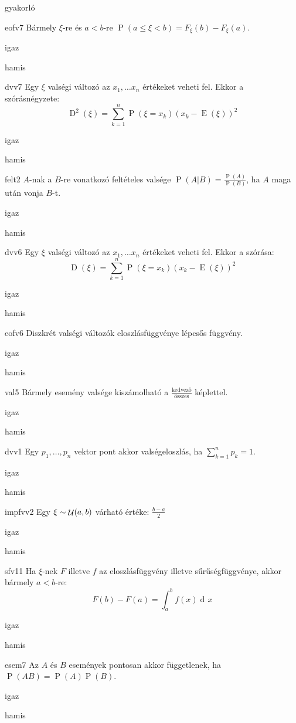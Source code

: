 \documentclass[12pt]{article}
\DeclareMathOperator{\E}{E}
\DeclareMathOperator{\D}{D}
\renewcommand{\P}{\operatorname{P}}
\renewcommand{\d}{\operatorname{d\! }} %
\DeclareMathOperator{\Unif}{{\cal U}}
\begin{document}
\begin{quiz}{gyakorló}
\begin{multi}{eofv7}
Bármely $\xi$-re és $a<b$-re $\P(a\le \xi <b)=F_{\xi}(b)-F_{\xi}(a)$.
\item* igaz
\item hamis
\end{multi}
\begin{multi}{dvv7}
Egy $\xi$ valségi változó az $x_1,\ldots x_n$ értékeket veheti fel. Ekkor a szórásnégyzete:
$$
\D^2(\xi)=\sum_{k=1}^n \P(\xi=x_k)(x_k-\E(\xi))^2
$$
\item* igaz
\item hamis
\end{multi}
\begin{multi}{felt2}
$A$-nak a $B$-re vonatkozó feltételes valsége $\P(A|B)=\frac{\P(A)}{\P(B)}$, ha $A$ maga után vonja $B$-t.
\item* igaz
\item hamis
\end{multi}
\begin{multi}{dvv6}
Egy $\xi$ valségi változó az $x_1,\ldots x_n$ értékeket veheti fel. Ekkor a szórása:
$$
\D(\xi)=\sum_{k=1}^n \P(\xi=x_k)(x_k-\E(\xi))^2
$$
\item igaz
\item* hamis
\end{multi}
\begin{multi}{eofv6}
Diszkrét valségi változók eloszlásfüggvénye lépcsős függvény.
\item* igaz
\item hamis
\end{multi}
\begin{multi}{val5}
Bármely esemény valsége kiszámolható a $\frac{\text{kedvező}}{\text{összes}}$ képlettel.
\item igaz
\item* hamis
\end{multi}
\begin{multi}{dvv1}
Egy $p_1,\ldots, p_n$ vektor pont akkor valségeloszlás, ha $\sum_{k=1}^n p_k=1$.
\item igaz
\item* hamis
\end{multi}
\begin{multi}{impfvv2}
Egy $\xi\sim \Unif(a,b)$ várható értéke: $\frac{b-a}{2}$
\item igaz
\item* hamis
\end{multi}
\begin{multi}{sfv11}
Ha $\xi$-nek $F$ illetve $f$ az eloszlásfüggvény illetve sűrűségfüggvénye, akkor bármely $a<b$-re:
$$
F(b)-F(a)=\int_{a}^{b}f(x)\d x
$$
\item* igaz
\item hamis
\end{multi}
\begin{multi}{esem7}
Az $A$ és $B$ események pontosan akkor függetlenek, ha $\P(AB)=\P(A)\P(B)$.
\item* igaz
\item hamis
\end{multi}
\end{quiz}
\end{document}
